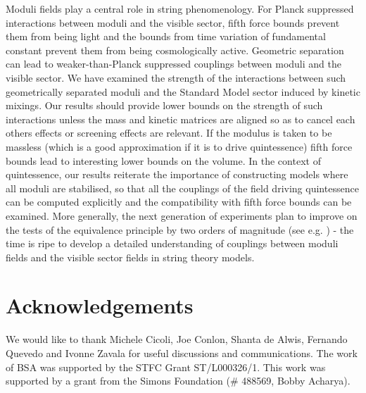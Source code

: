 \documentclass[11pt,a4paper]{article}
\begin{document}
Moduli fields play a central role in string phenomenology. For Planck suppressed interactions between  moduli and  the visible sector,  fifth force bounds  prevent them from being light and the bounds from time variation of fundamental constant prevent them from being cosmologically active. Geometric separation can lead to weaker-than-Planck suppressed couplings between moduli and the visible sector. We have examined the strength of the interactions between such geometrically separated moduli and the Standard Model sector induced by kinetic mixings. Our results should provide lower bounds on the strength of such interactions unless the mass and kinetic matrices are aligned so as to cancel each others effects or screening effects are relevant. If the modulus is taken to be massless (which is a good approximation if it is to drive quintessence) fifth force bounds lead to interesting lower bounds on the volume. In the context of quintessence, our results reiterate the importance of constructing models where all moduli are stabilised, so that all the couplings of the field driving  quintessence can be computed explicitly and the compatibility with fifth force bounds can be examined. More generally, the next generation of experiments plan to improve on the tests of the equivalence principle by two orders of magnitude (see e.g. \cite{Nobili:2018eym}) - the time is ripe to develop a detailed understanding of couplings between moduli fields and the visible sector fields in string theory models.

\section*{Acknowledgements}

We would like to thank  Michele Cicoli, Joe Conlon,  Shanta de Alwis, Fernando Quevedo and Ivonne Zavala for useful discussions and communications. The work of BSA was supported by the STFC Grant ST/L000326/1. This work was supported by a grant from the Simons Foundation (\# 488569, Bobby Acharya).
\end{document}
